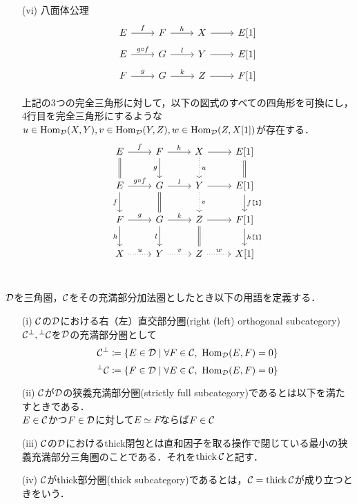 \begin{defn}
\begin{itemize}
	\item[(vi)]
		八面体公理\\
			\[
				\begin{tikzcd}[row sep=5pt]
			E \ar[r,"f"]& F\ar[r,"h"]& X \ar[r]& E[1]\\
			E \ar[r,"g\circ f"]& G\ar[r,"l"]& Y \ar[r]& E[1]\\
			F \ar[r,"g"]& G\ar[r,"k"]& Z \ar[r]& F[1]\\
		\end{tikzcd}
			\]
			上記の3つの完全三角形に対して，以下の図式のすべての四角形を可換にし，4行目を完全三角形にするような$u\in\operatorname{\mathrm{Hom}}_{{\mathcal D}}(X,Y),v\in\operatorname{\mathrm{Hom}}_{{\mathcal D}}(Y,Z),w\in\operatorname{\mathrm{Hom}}_{{\mathcal D}}(Z,X[1])$が存在する．
			\[
		\begin{tikzcd}
			E \ar[r,"f"]\ar[d,equal]& F\ar[r,"h"]\ar[d,"g",swap]& X\ar[d,"u",dotted] \ar[r]& E[1]\ar[d,equal]\\
			E \ar[r,"g\circ f"]\ar[d,"f",swap]& G\ar[r,"l"]\ar[d,equal]& Y\ar[d,"v",dotted] \ar[r]& E[1]\ar[d,"f\texttt{[1]}"]\\
			F \ar[r,"g"]\ar[d,"h",swap]& G\ar[r,"k"]\ar[d,"l",swap]& Z \ar[r]\ar[d,equal]& F[1]\ar[d,"h\texttt{[1]}"]\\
			X \ar[r,"u",dotted]& Y\ar[r,"v",dotted]& Z \ar[r,"w",dotted]& X[1]\\
		\end{tikzcd}
			\]
	\end{itemize}
\end{defn}

\begin{defn}
	${\mathcal D}$を三角圏，${\mathcal C}$をその充満部分加法圏としたとき以下の用語を定義する．
	\begin{itemize}
		\item[(i)]
			${\mathcal C}$の${\mathcal D}$における右（左）直交部分圏(right (left) orthogonal subcategory)${\mathcal C}^\perp,{}^\perp{\mathcal C}$を${\mathcal D}$の充満部分圏として
			\[\C^\perp\coloneq \{E\in\D\mid\forall F\in\C,\ \Hom_{\D}(E,F)=0\}\]
			\[{}^\perp\C\coloneq \{F\in\D\mid\forall E\in\C,\ \Hom_{\D}(E,F)=0\}\]
		\item[(ii)]
			${\mathcal C}$が${\mathcal D}$の狭義充満部分圏(strictly full subcategory)であるとは以下を満たすときである．\\
			$E\in{\mathcal C}$かつ$F\in{\mathcal D}$に対して$E\simeq F$ならば$F\in{\mathcal C}$
		\item[(iii)]
			${\mathcal C}$の${\mathcal D}$におけるthick閉包とは直和因子を取る操作で閉じている最小の狭義充満部分三角圏のことである．それを$\operatorname{\mathrm{thick}} {\mathcal C}$と記す．
		\item[(iv)]
			${\mathcal C}$がthick部分圏(thick subcategory)であるとは，${\mathcal C} = \operatorname{\mathrm{thick}}{\mathcal C}$が成り立つときをいう．
	\end{itemize}
\end{defn}
